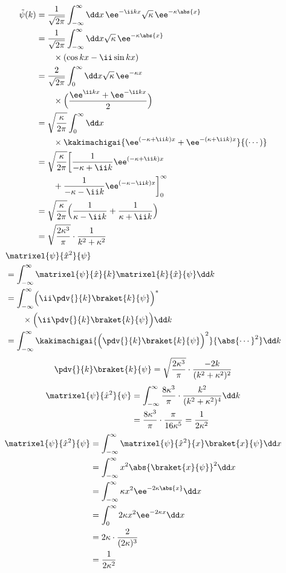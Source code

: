 \begin{align*}
\tilde{\psi}(k)&=\frac{1}{\sqrt{2\pi}}\int_{-\infty}^{\infty}\dd x\,\ee^{-\ii kx}\sqrt{\kappa}\,\ee^{-\kappa\abs{x}}\\
&=\frac{1}{\sqrt{2\pi}}\int_{-\infty}^{\infty}\dd x\sqrt{\kappa}\,\ee^{-\kappa\abs{x}}\\
&\qquad\times(\cos kx-\ii\sin kx)\\
&=\frac{2}{\sqrt{2\pi}}\int_{0}^{\infty}\dd x\sqrt{\kappa}\,\ee^{-\kappa x}\\
&\qquad\times\Bigl(\frac{\ee^{\ii kx}+\ee^{-\ii kx}}{2}\Bigr)\\
&=\sqrt{\frac{\kappa}{2\pi}}\int_{0}^{\infty}\dd x\\
&\qquad\times\kakimachigai{\ee^{(-\kappa+\ii k)x}+\ee^{-(\kappa+\ii k)x}}{(\cdots)}\\
&=\sqrt{\frac{\kappa}{2\pi}}\biggl[\frac{1}{-\kappa+\ii k}\ee^{(-\kappa+\ii k)x}\\
&\qquad+\frac{1}{-\kappa-\ii k}\ee^{(-\kappa-\ii k)x}\biggr]_{0}^{\infty}\\
&=\sqrt{\frac{\kappa}{2\pi}}\Bigl(\frac{1}{\kappa-\ii k}+\frac{1}{\kappa+\ii k}\Bigr)\\
&=\sqrt{\frac{2\kappa^{3}}{\pi}}\cdot\frac{1}{k^{2}+\kappa^{2}}
\end{align*}
\begin{align*}
&\matrixel{\psi}{\hat{x}^{2}}{\psi}\\
&=\int_{-\infty}^{\infty}\matrixel{\psi}{\hat{x}}{k}\matrixel{k}{\hat{x}}{\psi}\dd k\\
&=\int_{-\infty}^{\infty}\Bigl(\ii\pdv{}{k}\braket{k}{\psi}\Bigr)^{*}\\
&\qquad\times\Bigl(\ii\pdv{}{k}\braket{k}{\psi}\Bigr)\dd k\\
&=\int_{-\infty}^{\infty}\kakimachigai{\Bigl(\pdv{}{k}\braket{k}{\psi}\Bigr)^{2}}{\abs{\cdots}^{2}}\dd k
\end{align*}
\[ \pdv{}{k}\braket{k}{\psi}=\sqrt{\frac{2\kappa^{3}}{\pi}}\cdot\frac{-2k}{(k^{2}+\kappa^{2})^{2}} \]
\begin{align*}
\matrixel{\psi}{\hat{x}^{2}}{\psi}&=\int_{-\infty}^{\infty}\frac{8\kappa^{3}}{\pi}\cdot\frac{k^{2}}{(k^{2}+\kappa^{2})^{4}}\dd k\\
&=\frac{8\kappa^{3}}{\pi}\cdot\frac{\pi}{16\kappa^{5}}=\frac{1}{2\kappa^{2}}
\end{align*}
\begin{align*}
\matrixel{\psi}{\hat{x}^{2}}{\psi}&=\int_{-\infty}^{\infty}\matrixel{\psi}{\hat{x}^{2}}{x}\braket{x}{\psi}\dd x\\
&=\int_{-\infty}^{\infty}x^{2}\abs{\braket{x}{\psi}}^{2}\dd x\\
&=\int_{-\infty}^{\infty}\kappa x^{2}\ee^{-2\kappa\abs{x}}\dd x\\
&=\int_{0}^{\infty}2\kappa x^{2}\ee^{-2\kappa x}\dd x\\
&=2\kappa\cdot\frac{2}{(2\kappa)^{3}}\\
&=\frac{1}{2\kappa^{2}}
\end{align*}
